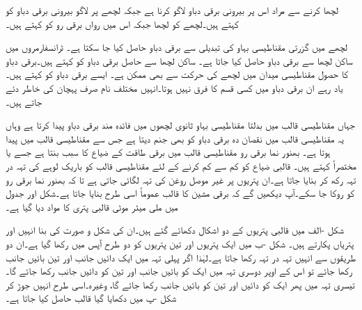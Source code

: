 لچھا  کرنے سے مراد اس پر بیرونی برقی دباو لاگو کرنا ہے  جبکہ لچھے پر لاگو بیرونی برقی دباو کو   کہتے ہیں۔لچھے  کو  لچھا جبکہ اس میں رواں برقی رو کو  کہتے ہیں۔

لچھے میں گزرتی مقناطیسی بہاو کی تبدیلی سے  برقی دباو حاصل کیا جا سکتا ہے۔ ٹرانسفارمروں میں ساکن لچھا سے برقی دباو حاصل کیا جاتا ہے۔ ساکن لچھا سے حاصل برقی دباو کو   کہتے ہیں۔برقی دباو کا حصول مقناطیسی میدان میں لچھے کی حرکت سے بھی ممکن ہے۔ ایسے برقی دباو کو   کہتے ہیں۔یاد رہے ان برقی دباو میں کسی قسم کا فرق نہیں ہوتا۔انہیں مختلف نام صرف پہچان کی خاطر دئے جاتے ہیں۔

جہاں مقناطیسی قالب میں بدلتا مقناطیسی بہاو ثانوی لچھوں میں فائدہ مند برقی دباو پیدا کرتا ہے وہاں یہ مقناطیسی قالب میں نقصان دہ برقی دباو کو بھی جنم دیتا ہے جس سے مقناطیسی قالب میں  پیدا ہوتا ہے۔ بھنور نما برقی رو مقناطیسی قالب میں برقی طاقت کے ضیاع کا سبب بنتا ہے جسے   یا  مختصراً  کہتے ہیں۔ قالبی ضیاع کو کم سے کم کرنے کے لئے مقناطیسی قالب کو  باریک لوہے کی  تہہ در تہہ رکھ کر بنایا جاتا ہے۔ان پتریوں پر غیر موصل روغن کی تہہ لگائی جاتی ہے تا کہ بھنور نما برقی رو کو روکا جا سکے۔آپ دیکھیں گے کہ برقی مشین کا قالب عموماً اسی طرح بنایا جاتا ہے۔شکل  اور جدول   میں  ملی میٹر موٹی  قالبی پتری کا  مواد دیا گیا ہے۔

شکل -الف میں قالبی پتریوں کے دو اشکال دکھائے گئے ہیں۔ان کی شکل و صورت کی بنا انہیں  اور   پتریاں پکارتے ہیں۔ شکل -ب میں ایک پتریوں اور تین پتریوں   کو دو طرح آپس میں رکھا گیا ہے۔ان دو طریقوں سے انہیں تہہ در تہہ رکھا جاتا ہے۔لہٰذا اگر پہلی تہہ میں ایک دائیں جانب اور تین بائیں جانب رکھا جائے تو اس کے اوپر دوسری تہہ میں ایک کو بائیں جانب اور تین کو دائیں جانب رکھا جائے گا۔تیسری تہہ میں پھر ایک کو دائیں اور تین کو بائیں جانب رکھا جائے گا، وغیرہ۔اسی طرح انہیں جوڑ کر شکل -پ میں دکھایا گیا قالب حاصل کیا جاتا ہے۔


